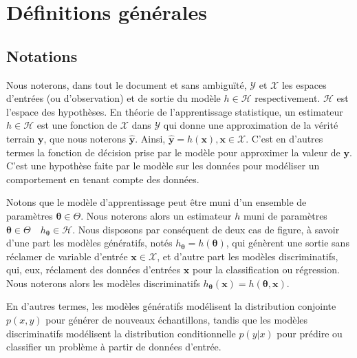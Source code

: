 \chapter{Définitions générales}

\section{Notations}

\noindent Nous noterons, dans tout le document et sans ambiguïté, $\mathcal{Y}$ et $\mathcal{X}$ les espaces d'entrées (ou d'observation) et de sortie du modèle $h \in \mathcal{H}$ respectivement. 
$\mathcal{H}$ est l'espace des hypothèses. En théorie de l'apprentissage statistique, un estimateur $h \in \mathcal{H}$ est une fonction de $\mathcal{X}$ dans $\mathcal{Y}$ qui donne une approximation de 
la vérité terrain $\boldsymbol{y}$, que nous noterons $\hat{\boldsymbol{y}}$. Ainsi, $\hat{\boldsymbol{y}} = h(\boldsymbol{x}), \boldsymbol{x} \in \mathcal{X}$. C'est en d'autres termes la fonction de décision
prise par le modèle pour approximer la valeur de $\boldsymbol{y}$. C'est une hypothèse faite par le modèle sur les données pour modéliser un comportement en tenant compte des données. \newline

\noindent Notons que le modèle d'apprentissage peut être muni d'un ensemble de paramètres $\boldsymbol{\theta} \in \Theta$. Nous noterons alors un estimateur $h$ muni de paramètres 
$\boldsymbol{\theta} \in \Theta \quad h_{\boldsymbol{\theta}} \in \mathcal{H}$. Nous disposons par conséquent de deux cas de figure, à savoir d'une part les modèles génératifs, notés $h_{\boldsymbol{\theta}} = h(\boldsymbol{\theta})$,
qui génèrent une sortie sans réclamer de variable d'entrée $\boldsymbol{x} \in \mathcal{X}$, et d'autre part les modèles discriminatifs, qui, eux, réclament des données d'entrées $\boldsymbol{x}$ pour la classification ou régression. 
Nous noterons alors les modèles discriminatifs $h_{\boldsymbol{\theta}}(\boldsymbol{x}) = h(\boldsymbol{\theta}, \boldsymbol{x})$. \newline

\noindent En d'autres termes, les modèles génératifs modélisent la distribution conjointe $p(x,y)$ pour générer de nouveaux échantillons, tandis que les modèles discriminatifs modélisent la distribution conditionnelle $p(y | x)$ pour prédire ou 
classifier un problème à partir de données d'entrée. \newline

